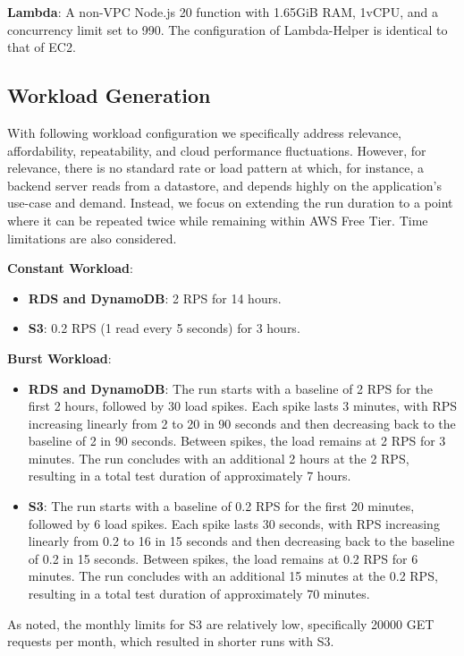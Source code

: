 \textbf{Lambda}:
A non-VPC Node.js 20 function with 1.65GiB RAM, 1vCPU, and a concurrency limit set to 990. The configuration of Lambda-Helper is identical to that of EC2.

\subsection{Workload Generation}
\label{sec:loads}

With following workload configuration we specifically address relevance, affordability, repeatability, and cloud performance fluctuations. However, for relevance, there is no standard rate or load pattern at which, for instance, a backend server reads from a datastore, and depends highly on the application's use-case and demand. Instead, we focus on extending the run duration to a point where it can be repeated twice while remaining within AWS Free Tier. Time limitations are also considered.

\textbf{Constant Workload}:
\begin{itemize}
	\item \textbf{RDS and DynamoDB}: 2 RPS for 14 hours.
	\item \textbf{S3}: 0.2 RPS (1 read every 5 seconds) for 3 hours.
\end{itemize}

\textbf{Burst Workload}:
\begin{itemize}
	\item \textbf{RDS and DynamoDB}: The run starts with a baseline of 2 RPS for the first 2 hours, followed by 30 load spikes. Each spike lasts 3 minutes, with RPS increasing linearly from 2 to 20 in 90 seconds and then decreasing back to the baseline of 2 in 90 seconds. Between spikes, the load remains at 2 RPS for 3 minutes. The run concludes with an additional 2 hours at the 2 RPS, resulting in a total test duration of approximately 7 hours.
	\item \textbf{S3}: The run starts with a baseline of 0.2 RPS for the first 20 minutes, followed by 6 load spikes. Each spike lasts 30 seconds, with RPS increasing linearly from 0.2 to 16 in 15 seconds and then decreasing back to the baseline of 0.2 in 15 seconds. Between spikes, the load remains at 0.2 RPS for 6 minutes. The run concludes with an additional 15 minutes at the 0.2 RPS, resulting in a total test duration of approximately 70 minutes.
\end{itemize}

As noted, the monthly limits for S3 are relatively low, specifically 20000 GET requests per month, which resulted in shorter runs with S3.

